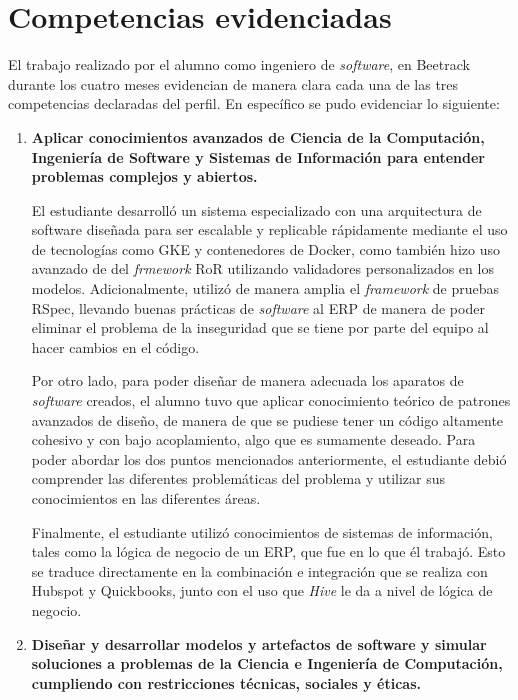 \section{Competencias evidenciadas}

  El trabajo realizado por el alumno como ingeniero de \textit{software}, en Beetrack durante los cuatro meses evidencian de manera clara cada una de las tres competencias declaradas del perfil. En específico se pudo evidenciar lo siguiente:

  \begin{enumerate}
    \item \textbf{Aplicar conocimientos avanzados de Ciencia de la Computación, Ingeniería de Software y Sistemas de Información para entender problemas complejos y abiertos.}
    
    El estudiante desarrolló un sistema especializado con una arquitectura de software diseñada para ser escalable y replicable rápidamente mediante el uso de tecnologías como GKE y contenedores de Docker, como también hizo uso avanzado de del \textit{frmework} RoR utilizando validadores personalizados en los modelos. Adicionalmente, utilizó de manera amplia el \textit{framework} de pruebas RSpec, llevando buenas prácticas de \textit{software} al ERP de manera de poder eliminar el problema de la inseguridad que se tiene por parte del equipo al hacer cambios en el código.

    Por otro lado, para poder diseñar de manera adecuada los aparatos de \textit{software} creados, el alumno tuvo que aplicar conocimiento teórico de patrones avanzados de diseño, de manera de que se pudiese tener un código altamente cohesivo y con bajo acoplamiento, algo que es sumamente deseado. Para poder abordar los dos puntos mencionados anteriormente, el estudiante debió comprender las diferentes problemáticas del problema y utilizar sus conocimientos en las diferentes áreas.

    Finalmente, el estudiante utilizó conocimientos de sistemas de información, tales como la lógica de negocio de un ERP, que fue en lo que él trabajó. Esto se traduce directamente en la combinación e integración que se realiza con Hubspot y Quickbooks, junto con el uso que \textit{Hive} le da a nivel de lógica de negocio.

    \item \textbf{Diseñar y desarrollar modelos y artefactos de software y simular soluciones a problemas de la Ciencia e Ingeniería de Computación, cumpliendo con restricciones técnicas, sociales y éticas.}
    

\end{enumerate}
